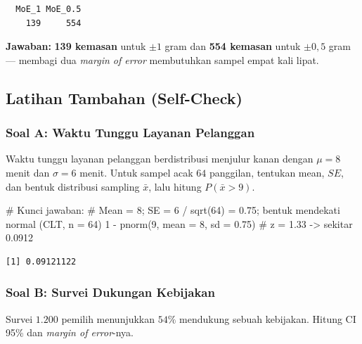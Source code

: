 \documentclass[
  indonesian,
  letterpaper,
]{book}
\newenvironment{Shaded}{\begin{snugshade}}{\end{snugshade}}
\newcommand{\AttributeTok}[1]{\textcolor[rgb]{0.40,0.45,0.13}{#1}}
\newcommand{\CommentTok}[1]{\textcolor[rgb]{0.37,0.37,0.37}{#1}}
\newcommand{\DecValTok}[1]{\textcolor[rgb]{0.68,0.00,0.00}{#1}}
\newcommand{\FloatTok}[1]{\textcolor[rgb]{0.68,0.00,0.00}{#1}}
\newcommand{\FunctionTok}[1]{\textcolor[rgb]{0.28,0.35,0.67}{#1}}
\newcommand{\NormalTok}[1]{\textcolor[rgb]{0.00,0.23,0.31}{#1}}
\newcommand{\SpecialCharTok}[1]{\textcolor[rgb]{0.37,0.37,0.37}{#1}}
\begin{document}
\begin{verbatim}
  MoE_1 MoE_0.5 
    139     554 
\end{verbatim}

\textbf{Jawaban:} \textbf{139 kemasan} untuk \(\pm 1\) gram dan
\textbf{554 kemasan} untuk \(\pm 0{,}5\) gram --- membagi dua
\emph{margin of error} membutuhkan sampel empat kali lipat.

\subsection{Latihan Tambahan
(Self-Check)}\label{latihan-tambahan-self-check-5}

\subsubsection{Soal A: Waktu Tunggu Layanan
Pelanggan}\label{soal-a-waktu-tunggu-layanan-pelanggan}

Waktu tunggu layanan pelanggan berdistribusi menjulur kanan dengan
\(\mu = 8\) menit dan \(\sigma = 6\) menit. Untuk sampel acak \(64\)
panggilan, tentukan mean, \(SE\), dan bentuk distribusi sampling
\(\bar{x}\), lalu hitung \(P(\bar{x} > 9)\).

\begin{Shaded}
\begin{Highlighting}[]
\CommentTok{\# Kunci jawaban:}
\CommentTok{\# Mean = 8; SE = 6 / sqrt(64) = 0.75; bentuk mendekati normal (CLT, n = 64)}
\DecValTok{1} \SpecialCharTok{{-}} \FunctionTok{pnorm}\NormalTok{(}\DecValTok{9}\NormalTok{, }\AttributeTok{mean =} \DecValTok{8}\NormalTok{, }\AttributeTok{sd =} \FloatTok{0.75}\NormalTok{) }\CommentTok{\# z = 1.33 {-}\textgreater{} sekitar 0.0912}
\end{Highlighting}
\end{Shaded}

\begin{verbatim}
[1] 0.09121122
\end{verbatim}

\subsubsection{Soal B: Survei Dukungan
Kebijakan}\label{soal-b-survei-dukungan-kebijakan}

Survei \(1.200\) pemilih menunjukkan \(54\%\) mendukung sebuah
kebijakan. Hitung CI 95\% dan \emph{margin of error}-nya.
\end{document}
